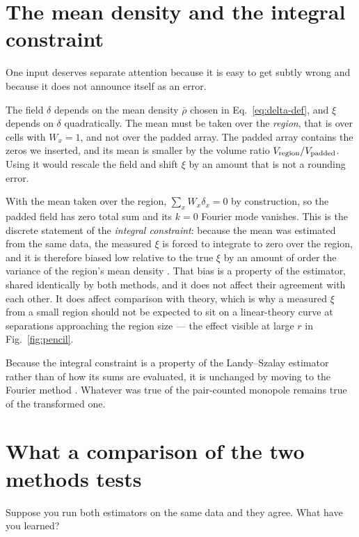 \documentclass[12pt]{article}
\newcommand{\W}{W}
\begin{document}
\section{The mean density and the integral constraint}\label{sec:integral-constraint}

One input deserves separate attention because it is easy to get subtly wrong
and because it does not announce itself as an error.

The field $\delta$ depends on the mean density $\bar\rho$ chosen in
Eq.~\eqref{eq:delta-def}, and $\hat\xi$ depends on $\delta$ quadratically.
The mean must be taken over the \emph{region}, that is over cells with
$\W_x = 1$, and not over the padded array.  The padded array contains the
zeros we inserted, and its mean is smaller by the volume ratio
$V_{\rm region}/V_{\rm padded}$.  Using it would rescale the field and shift
$\xi$ by an amount that is not a rounding error.

With the mean taken over the region, $\sum_x \W_x\delta_x = 0$ by
construction, so the padded field has zero total sum and its $k=0$ Fourier
mode vanishes.  This is the discrete statement of the \emph{integral
constraint}: because the mean was estimated from the same data, the measured
$\xi$ is forced to integrate to zero over the region, and it is therefore
biased low relative to the true $\xi$ by an amount of order the variance of
the region's mean density \citep{Peebles1980}.  That bias is a property of
the estimator, shared identically by both methods, and it does not affect
their agreement with each other.  It does affect comparison with theory, which
is why a measured $\xi$ from a small region should not be expected to sit on
a linear-theory curve at separations approaching the region size --- the
effect visible at large $r$ in Fig.~\ref{fig:pencil}.

Because the integral constraint is a property of the Landy--Szalay estimator
rather than of how its sums are evaluated, it is unchanged by moving to the
Fourier method \citep{Slepian2016}.  Whatever was true of the pair-counted
monopole remains true of the transformed one.

\section{What a comparison of the two methods tests}\label{sec:validates}

Suppose you run both estimators on the same data and they agree.  What have
you learned?
\end{document}
